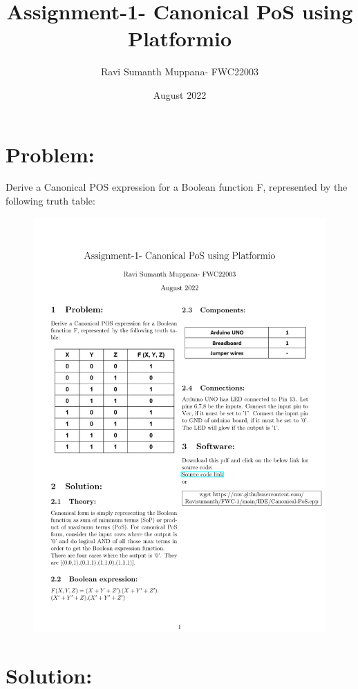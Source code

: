 \documentclass[a4paper,12pt,twocolumn]{article}
\title{Assignment-1- Canonical PoS using Platformio}
\author{Ravi Sumanth Muppana- FWC22003}
\date{August 2022}
\begin{document}
\maketitle

\section{Problem:}
Derive a Canonical POS expression for a Boolean function F, represented by the following truth table:

\begin{figure}[h]
\centering
\includegraphics[width=1.0\columnwidth]{Canonical-PoS}
\label{Truth Table}
\end{figure}
\maketitle\section{Solution:}
\end{document}
